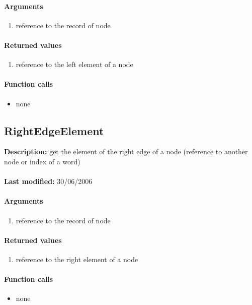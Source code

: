 \paragraph{Arguments}
\begin{enumerate}
\item reference to the record of node
\end{enumerate}

\paragraph{Returned values}
\begin{enumerate}
\item reference to the left element of a node
\end{enumerate}

\paragraph{Function calls}
\begin{itemize}
\item none
\end{itemize}

\subsection{RightEdgeElement}
\textbf{Description:} get the element of the right edge of a node (reference to another node or index of a word)\\
\\\textbf{Last modified:} 30/06/2006

\paragraph{Arguments}
\begin{enumerate}
\item reference to the record of node
\end{enumerate}

\paragraph{Returned values}
\begin{enumerate}
\item reference to the right element of a node
\end{enumerate}

\paragraph{Function calls}
\begin{itemize}
\item none
\end{itemize}

